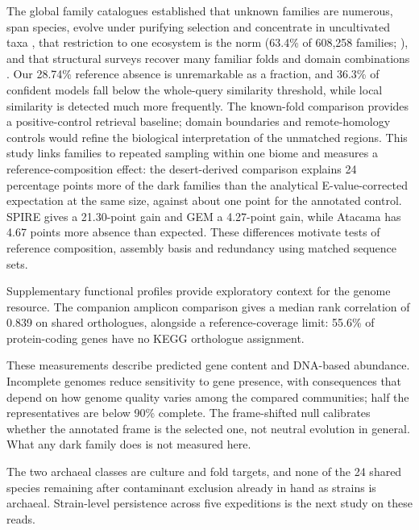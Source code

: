 \documentclass[11pt]{article}
\begin{document}
The global family catalogues established that unknown families are numerous, span species, evolve
under purifying selection and concentrate in uncultivated taxa
\citep{rodriguezdelrio2024fesnov,pavlopoulos2023darkmatter,vanni2022agnostos}, that restriction to
one ecosystem is the norm (63.4\% of 608{,}258 families; \citep{aplakidou2025quadrupling}), and
that structural surveys recover many familiar folds and domain combinations
\citep{lau2024ted,yeo2025afesm}. Our 28.74\% reference absence is unremarkable as a fraction, and
36.3\% of confident models fall below the whole-query similarity threshold, while local
similarity is detected much more frequently. The known-fold comparison provides a positive-control
retrieval baseline; domain boundaries and remote-homology controls would refine the biological
interpretation of the unmatched regions. This study links families to repeated sampling within one biome and measures a reference-composition effect: the desert-derived comparison explains 24 percentage points more of the dark families
than the analytical E-value-corrected expectation at the same size, against about one point for the annotated control. SPIRE gives a 21.30-point gain and GEM a 4.27-point gain, while Atacama has 4.67 points more absence than expected. These differences motivate tests of reference composition, assembly basis and redundancy using matched sequence sets.

Supplementary functional profiles provide exploratory context for the genome resource.
The companion amplicon comparison gives a median rank correlation of 0.839 on shared
orthologues, alongside a reference-coverage limit: 55.6\% of protein-coding genes have no
KEGG orthologue assignment.

These measurements describe predicted gene content and DNA-based abundance. Incomplete genomes
reduce sensitivity to gene presence, with consequences that depend on how genome quality varies
among the compared communities; half the representatives
are below 90\% complete. The frame-shifted null
calibrates whether the annotated frame is the selected one, not neutral evolution in general. What
any dark family does is not measured here.

The two archaeal classes are culture and fold targets, and none of the 24 shared species remaining after contaminant exclusion already in
hand as strains is archaeal. Strain-level persistence across five expeditions is the next study on
these reads.

\end{document}
